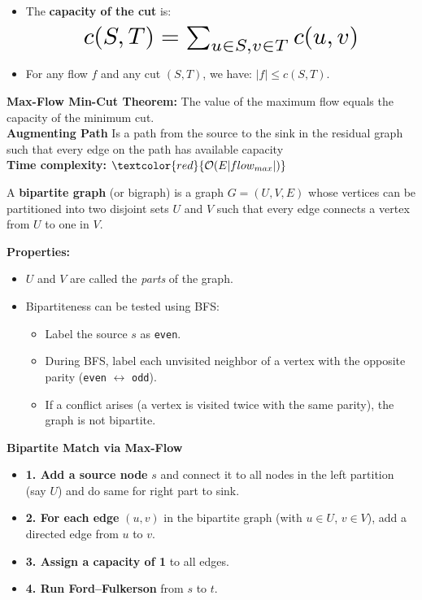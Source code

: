 \documentclass[a4paper,landscape]{article}
\newcommand{\timecomplexity}[1]{\textcolor{red}{#1}}
\newcommand{\bigo}{\mathcal{O}}
\begin{document}
\begin{multicols}{7}
\begin{itemize}[noitemsep, topsep=0pt]
    \item The \textbf{capacity of the cut} is:
    \[
    \resizebox{0.7\textwidth}{!}{$
    c(S, T) = \sum_{u \in S, v \in T} c(u, v)
    $}
    \]
    
    \item For any flow $f$ and any cut $(S, T)$, we have: $|f| \leq c(S, T)$.
\end{itemize}


\textbf{Max-Flow Min-Cut Theorem:} The value of the maximum flow equals the capacity of the minimum cut.\\
\textbf{Augmenting Path}
Is a path from the source to the sink in the residual graph such that every edge on the path has available capacity \\
\textbf{Time complexity:} \(\timecomplexity{\bigo(E|flow_{max}|)}\)
\endtcolorbox

\tcolorbox[mybox={Bipartite Graphs}]
A \textbf{bipartite graph} (or bigraph) is a graph $G = (U, V, E)$ whose vertices can be partitioned into two disjoint sets $U$ and $V$ such that every edge connects a vertex from $U$ to one in $V$.

\textbf{Properties:}
\begin{itemize}[noitemsep, topsep=0pt]
    \item $U$ and $V$ are called the \textit{parts} of the graph.
    \item Bipartiteness can be tested using BFS:
    \begin{itemize}[noitemsep, topsep=0pt]
        \item Label the source $s$ as \texttt{even}.
        \item During BFS, label each unvisited neighbor of a vertex with the opposite parity (\texttt{even} $\leftrightarrow$ \texttt{odd}).
        \item If a conflict arises (a vertex is visited twice with the same parity), the graph is not bipartite.
    \end{itemize}
\end{itemize}
 \textbf{Bipartite Match via Max-Flow}
\begin{itemize}
  \item \textbf{1. Add a source node} $s$ and connect it to all nodes in the left partition (say $U$) and do same for right part to sink.
  \item \textbf{2. For each edge} $(u, v)$ in the bipartite graph (with $u \in U$, $v \in V$), add a directed edge from $u$ to $v$.
  \item \textbf{3. Assign a capacity of 1} to all edges.
  \item \textbf{4. Run Ford–Fulkerson} from $s$ to $t$.
\end{itemize}
\endtcolorbox


\end{multicols}
\end{document}
